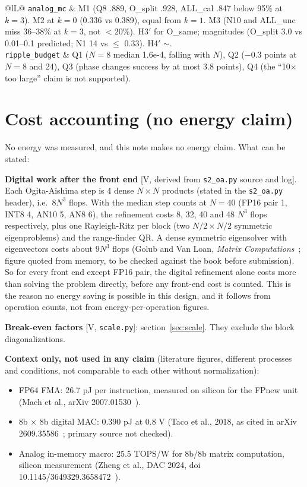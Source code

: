 \documentclass[11pt]{article}
\newcommand{\ok}{\ding{51}}
\newcommand{\no}{\ding{55}}
\newcommand{\partly}{$\sim$}
\newcommand{\x}{$\times$}
\newcommand{\scr}[1]{\texttt{#1}}
\begin{document}
\begin{center}
\begin{tabularx}{\textwidth}{@{}lL@{}}
\scr{analog\_mc} & M1 \no{} (Q8 .889, O\_split .928, ALL\_cal .847 below 95\% at $k = 3$). M2 \no{} at $k = 0$ (0.336 vs 0.389), equal from $k = 1$. M3 \no{} (N10 and ALL\_unc miss 36--38\% at $k = 3$, not $< 20$\%). H3$'$ \ok{} for O\_same; magnitudes \no{} (O\_split 3.0 vs 0.01--0.1 predicted; N1 14 vs $\leq$ 0.33). H4$'$ \partly. \\
\scr{ripple\_budget} & Q1 \ok{} ($N = 8$ median 1.6e-4, falling with $N$), Q2 \ok{} ($-$0.3 points at $N = 8$ and 24), Q3 \ok{} (phase changes success by at most 3.8 points), Q4 \ok{} (the ``10\x{} too large'' claim is not supported). \\
\bottomrule
\end{tabularx}
\end{center}

\section{Cost accounting (no energy claim)}\label{sec:cost}

No energy was measured, and this note makes no energy claim. What can be stated:

\textbf{Digital work after the front end} [V, derived from \scr{s2\_oa.py} source and log]. Each Ogita-Aishima step is 4 dense $N \times N$ products (stated in the \scr{s2\_oa.py} header), i.e.\ $8N^3$ flops. With the median step counts at $N = 40$ (FP16 pair 1, INT8 4, AN10 5, AN8 6), the refinement costs 8, 32, 40 and 48 $N^3$ flops respectively, plus one Rayleigh-Ritz per block (two $N/2 \times N/2$ symmetric eigenproblems) and the range-finder QR. A dense symmetric eigensolver with eigenvectors costs about $9N^3$ flops (Golub and Van Loan, \emph{Matrix Computations}~\cite{gvl}; figure quoted from memory, to be checked against the book before submission). So for every front end except FP16 pair, the digital refinement alone costs more than solving the problem directly, before any front-end cost is counted. This is the reason no energy saving is possible in this design, and it follows from operation counts, not from energy-per-operation figures.

\textbf{Break-even factors} [V, \scr{scale.py}]: section~\ref{sec:scale}. They exclude the block diagonalizations.

\textbf{Context only, not used in any claim} (literature figures, different processes and conditions, not comparable to each other without normalization):
\begin{itemize}
  \item FP64 FMA: 26.7 pJ per instruction, measured on silicon for the FPnew unit (Mach et al., arXiv 2007.01530~\cite{mach}).
  \item 8b \x{} 8b digital MAC: 0.390 pJ at 0.8 V (Taco et al., 2018, as cited in arXiv 2609.35586~\cite{taco}; primary source not checked).
  \item Analog in-memory macro: 25.5 TOPS/W for 8b/8b matrix computation, silicon measurement (Zheng et al., DAC 2024, doi 10.1145/3649329.3658472~\cite{zheng}).
\end{itemize}
\end{document}
